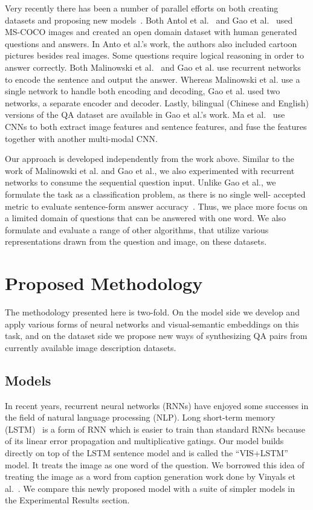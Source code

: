 \documentclass{article} \usepackage{nips15submit_e,times}
\renewcommand{\#}[1]{\textbf{#1}}
\begin{document}
Very recently there has been a number of parallel efforts on both creating
datasets and proposing new models~\cite{antol14, malinowski15, gao15, ma15}.
Both Antol et al.~\cite{antol14} and Gao et al.~\cite{gao15} used MS-COCO
\cite{mscoco} images and created an open domain dataset with human generated
questions and answers. In Anto et al.'s work, the authors also included cartoon
pictures besides real images. Some questions require logical reasoning in order
to answer correctly. Both Malinowski et al.~\cite{malinowski15} and Gao et al.
\cite{gao15} use recurrent networks to encode the sentence and output the
answer. Whereas Malinowski et al. use a single network to handle both encoding
and decoding, Gao et al. used two networks, a separate encoder and decoder.
Lastly, bilingual (Chinese and English) versions of the QA dataset are
available in Gao et al.'s work. Ma et al.~\cite{ma15} use CNNs to both extract
image features and sentence features, and fuse the features together with
another multi-modal CNN.

Our approach is developed independently from the work above. Similar to the
work of Malinowski et al. and Gao et al., we also experimented with recurrent
networks to consume the sequential question input. Unlike Gao et al., we
formulate the task as a classification problem, as there is no single well-
accepted metric to evaluate sentence-form answer
accuracy~\cite{mscoco_captions}. Thus, we place more focus on a limited domain
of questions that can be answered with one word. We also formulate and evaluate
a range of other algorithms, that utilize various representations drawn from
the question and image, on these datasets.

\section{Proposed Methodology}
The methodology presented here is two-fold. On the model side we develop and
apply various forms of neural networks and visual-semantic embeddings on this
task, and on the dataset side we propose new ways of synthesizing QA pairs from
currently available image description datasets.

\subsection{Models}
In recent years, recurrent neural networks (RNNs) have enjoyed some successes
in the field of natural language processing (NLP). Long short-term memory
(LSTM)~\cite{hochreiter97} is a form of RNN which is easier to train than
standard RNNs because of its linear error propagation and multiplicative
gatings. Our model builds directly on top of the LSTM sentence model and is
called the ``VIS+LSTM'' model. It treats the image as one word of the question.
We borrowed this idea of treating the image as a word from caption generation
work done by Vinyals et al.~\cite{vinyals14}. We compare this newly
proposed model with a suite of simpler models in the Experimental Results
section.
\end{document}
